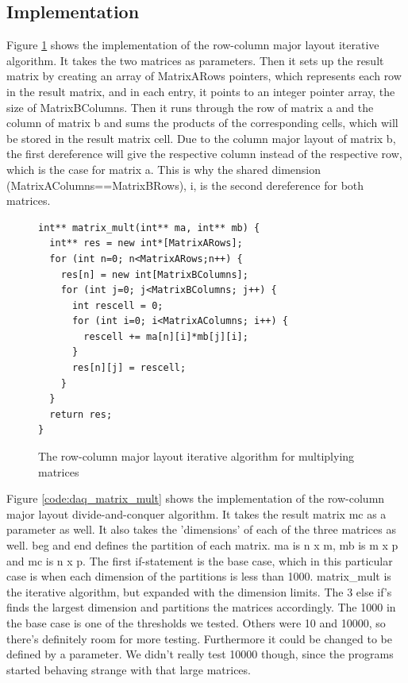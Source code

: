\documentclass{article}
\begin{document}
\subsection{Implementation}
Figure \ref{code:iterative_matrix_mult} shows the implementation of the row-column major layout iterative algorithm. It takes the two matrices as parameters. Then it sets up the result matrix by creating an array of MatrixARows pointers, which represents each row in the result matrix, and in each entry, it points to an integer pointer array, the size of MatrixBColumns. Then it runs through the row of matrix a and the column of matrix b and sums the products of the corresponding cells, which will be stored in the result matrix cell. Due to the column major layout of matrix b, the first dereference will give the respective column instead of the respective row, which is the case for matrix a. This is why the shared dimension (MatrixAColumns==MatrixBRows), i, is the second dereference for both matrices.

\begin{figure}[H]
	\centering
	\begin{lstlisting}
int** matrix_mult(int** ma, int** mb) {
  int** res = new int*[MatrixARows];
  for (int n=0; n<MatrixARows;n++) {
    res[n] = new int[MatrixBColumns];
    for (int j=0; j<MatrixBColumns; j++) {
      int rescell = 0;
      for (int i=0; i<MatrixAColumns; i++) {
        rescell += ma[n][i]*mb[j][i];
      }
      res[n][j] = rescell;
    }
  }
  return res;
}
	\end{lstlisting}	
	\caption{The row-column major layout iterative algorithm for multiplying matrices}
	\label{code:iterative_matrix_mult}
\end{figure}

Figure \ref{code:daq_matrix_mult} shows the implementation of the row-column major layout divide-and-conquer algorithm. It takes the result matrix mc as a parameter as well. It also takes the 'dimensions' of each of the three matrices as well. \*beg and \*end defines the partition of each matrix. ma is n x m, mb is m x p and mc is n x p. The first if-statement is the base case, which in this particular case is when each dimension of the partitions is less than 1000. matrix\_mult is the iterative algorithm, but expanded with the dimension limits. The 3 else if's finds the largest dimension and partitions the matrices accordingly. The 1000 in the base case is one of the thresholds we tested. Others were 10 and 10000, so there's definitely room for more testing. Furthermore it could be changed to be defined by a parameter. We didn't really test 10000 though, since the programs started behaving strange with that large matrices.
\end{document}
